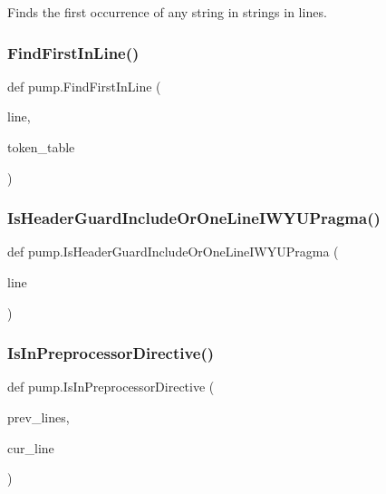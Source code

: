 \begin{DoxyVerb}Finds the first occurrence of any string in strings in lines.\end{DoxyVerb}
 \mbox{\label{namespacepump_af9f92ec64fe45399c7e051115a107ee7}} 
\subsubsection{\texorpdfstring{Find\+First\+In\+Line()}{FindFirstInLine()}}
{\footnotesize\ttfamily def pump.\+Find\+First\+In\+Line (\begin{DoxyParamCaption}\item[{}]{line,  }\item[{}]{token\+\_\+table }\end{DoxyParamCaption})}

\mbox{\label{namespacepump_ac8a553b60dc83d100361a0e98d98451b}} 
\subsubsection{\texorpdfstring{Is\+Header\+Guard\+Include\+Or\+One\+Line\+I\+W\+Y\+U\+Pragma()}{IsHeaderGuardIncludeOrOneLineIWYUPragma()}}
{\footnotesize\ttfamily def pump.\+Is\+Header\+Guard\+Include\+Or\+One\+Line\+I\+W\+Y\+U\+Pragma (\begin{DoxyParamCaption}\item[{}]{line }\end{DoxyParamCaption})}

\mbox{\label{namespacepump_aa33101b01d5781710262f3b5dadd8bc8}} 
\subsubsection{\texorpdfstring{Is\+In\+Preprocessor\+Directive()}{IsInPreprocessorDirective()}}
{\footnotesize\ttfamily def pump.\+Is\+In\+Preprocessor\+Directive (\begin{DoxyParamCaption}\item[{}]{prev\+\_\+lines,  }\item[{}]{cur\+\_\+line }\end{DoxyParamCaption})}

